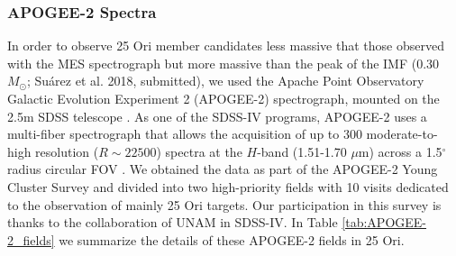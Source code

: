 \documentclass[12pt]{article}
\begin{document}
\subsubsection{APOGEE-2 Spectra}
\label{sec_APOGEE-2:spectra}
In order to observe 25 Ori member candidates less massive that those observed with the MES spectrograph but more massive than the peak of the IMF (0.30 $M_\odot$; Su\'arez et al. 2018, submitted), we used the Apache Point Observatory Galactic Evolution Experiment 2 (\ac{APOGEE-2}) spectrograph, mounted on the 2.5m SDSS telescope \citep{Gunn2006,Blanton2017}. As one of the SDSS-IV programs, APOGEE-2 uses a multi-fiber spectrograph that allows the acquisition of up to 300 moderate-to-high resolution ($R\sim22500$) spectra at the $H$-band (1.51-1.70 $\mu$m) across a 1.5$^\circ$ radius circular FOV \citep{Wilson2010,Majewski2017}. We obtained the data as part of the APOGEE-2 Young Cluster Survey and divided into two high-priority fields with 10 visits dedicated to the observation of mainly 25 Ori targets. Our participation in this survey is thanks to the collaboration of UNAM in SDSS-IV. In Table \ref{tab:APOGEE-2_fields} we summarize the details of these APOGEE-2 fields in 25 Ori. %
\end{document}
